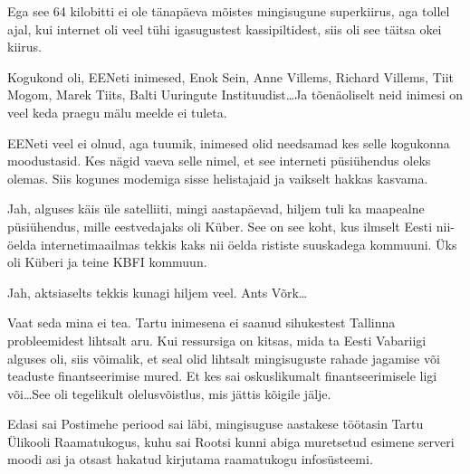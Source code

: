 Ega see 64 kilobitti ei ole tänapäeva mõistes mingisugune superkiirus, aga tollel ajal, kui internet oli veel tühi igasugustest kassipiltidest, siis oli see täitsa okei kiirus.


Kogukond oli,  EENeti inimesed, Enok Sein, Anne Villems, Richard Villems, Tiit Mogom, Marek Tiits, Balti Uuringute Instituudist\ldots	 Ja tõenäoliselt neid inimesi on veel keda praegu mälu meelde ei tuleta.


EENeti veel ei olnud, aga tuumik, inimesed olid needsamad kes  selle kogukonna moodustasid. Kes nägid vaeva selle nimel, et see interneti püsiühendus oleks olemas. Siis kogunes  modemiga sisse helistajaid ja vaikselt hakkas kasvama.


Jah, alguses käis üle satelliiti, mingi aastapäevad, hiljem tuli ka maapealne püsiühendus, mille  eestvedajaks oli Küber. See on see koht, kus ilmselt Eesti nii-öelda  internetimaailmas tekkis kaks nii öelda rististe suuskadega kommuuni. Üks oli  Küberi  ja teine KBFI kommuun.


Jah, aktsiaselts tekkis  kunagi hiljem veel. Ants Võrk\ldots


Vaat seda mina ei tea. Tartu inimesena ei saanud sihukestest Tallinna probleemidest  lihtsalt aru. Kui ressursiga on kitsas, mida ta Eesti Vabariigi alguses oli, siis võimalik, et seal olid lihtsalt mingisuguste rahade jagamise või teaduste finantseerimise mured. Et kes sai oskuslikumalt finantseerimisele ligi või\dots See oli tegelikult olelusvõistlus, mis jättis kõigile jälje.


Edasi sai Postimehe periood sai läbi, mingisuguse aastakese töötasin Tartu Ülikooli Raamatukogus, kuhu sai Rootsi kunni abiga muretsetud esimene serveri moodi asi ja otsast hakatud kirjutama raamatukogu infosüsteemi.

